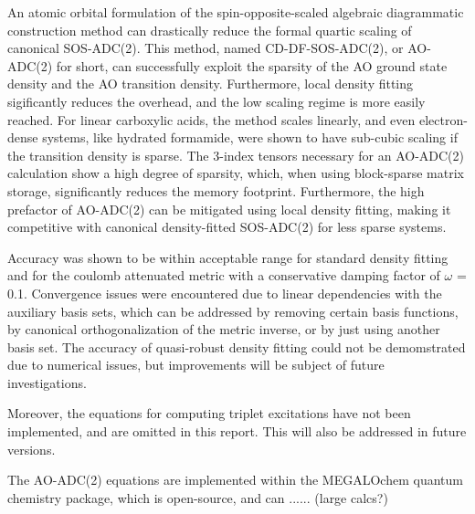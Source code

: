 An atomic orbital formulation of the spin-opposite-scaled algebraic diagrammatic construction method can drastically reduce the formal quartic scaling of canonical SOS-ADC(2). This method, named CD-DF-SOS-ADC(2), or AO-ADC(2) for short, can successfully exploit the sparsity of the AO ground state density and the AO transition density. Furthermore, local density fitting sigificantly reduces the overhead, and the low scaling regime is more easily reached. For linear carboxylic acids, the method scales linearly, and even electron-dense systems, like hydrated formamide, were shown to have sub-cubic scaling if the transition density is sparse. The 3-index tensors necessary for an AO-ADC(2) calculation show a high degree of sparsity, which, when using block-sparse matrix storage, significantly reduces the memory footprint. Furthermore, the high prefactor of AO-ADC(2) can be mitigated using local density fitting, making it competitive with canonical density-fitted SOS-ADC(2) for less sparse systems. 

Accuracy was shown to be within acceptable range for standard density fitting and for the coulomb attenuated metric with a conservative damping factor of $\omega$ = 0.1. Convergence issues were encountered due to linear dependencies with the auxiliary basis sets, which can be addressed by removing certain basis functions, by canonical orthogonalization of the metric inverse, or by just using another basis set. The accuracy of quasi-robust density fitting could not be demomstrated due to numerical issues, but improvements will be subject of future investigations. 

Moreover, the equations for computing triplet excitations have not been implemented, and are omitted in this report. This will also be addressed in future versions. 

The AO-ADC(2) equations are implemented within the MEGALOchem quantum chemistry package, which is open-source, and can ...... (large calcs?)